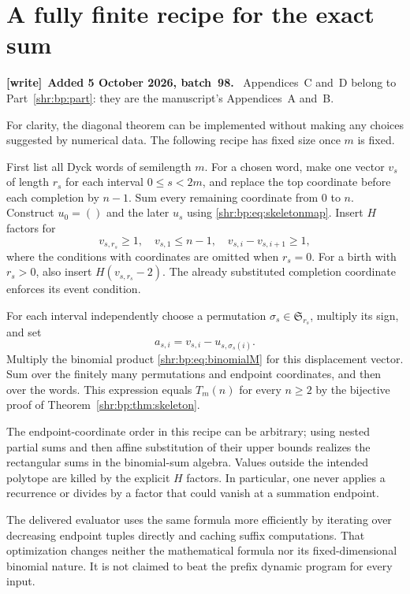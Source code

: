 \documentclass[11pt,letterpaper]{article}
\numberwithin{equation}{section}
\theoremstyle{definition}
\newcommand{\1}{\mathbf 1}
\newcommand{\Sym}{\mathfrak S}
\newenvironment{writenote}[1][]{\par\smallskip\begingroup\small
 \noindent\textbf{[write]}\if\relax\detokenize{#1}\relax\else~\textbf{#1.}\fi\ }%
 {\par\endgroup\smallskip}
\begin{document}
\section{A fully finite recipe for the exact sum}
\label{shr:bp:app:exact}
\begin{writenote}[Added 5 October 2026, batch~98]
Appendices~C and~D belong to Part~\ref{shr:bp:part}: they are the
manuscript's Appendices~A and~B.
\end{writenote}
For clarity, the diagonal theorem can be implemented without making any
choices suggested by numerical data. The following recipe has fixed
size once $m$ is fixed.

First list all Dyck words of semilength $m$. For a chosen word, make one
vector $v_s$ of length $r_s$ for each interval $0\le s<2m$, and replace
the top coordinate before each completion by $n-1$. Sum every remaining
coordinate from $0$ to $n$. Construct $u_0=()$ and the later $u_s$ using
\eqref{shr:bp:eq:skeletonmap}. Insert $H$ factors for
\[
 v_{s,r_s}\ge1,\quad v_{s,1}\le n-1,\quad
 v_{s,i}-v_{s,i+1}\ge1,
\]
where the conditions with coordinates are omitted when $r_s=0$.
For a birth with $r_s>0$, also insert $H(v_{s,r_s}-2)$.
The already substituted completion coordinate enforces its event condition.

For each interval independently choose a permutation
$\sigma_s\in\Sym_{r_s}$, multiply its sign, and set
\[
 a_{s,i}=v_{s,i}-u_{s,\sigma_s(i)}.
\]
Multiply the binomial product \eqref{shr:bp:eq:binomialM} for this displacement
vector. Sum over the finitely many permutations and endpoint coordinates,
and then over the words. This expression equals $T_m(n)$ for every
$n\ge2$ by the bijective proof of Theorem~\ref{shr:bp:thm:skeleton}.

The endpoint-coordinate order in this recipe can be arbitrary; using
nested partial sums and then affine substitution of their upper bounds
realizes the rectangular sums in the binomial-sum algebra. Values outside
the intended polytope are killed by the explicit $H$ factors. In
particular, one never applies a recurrence or divides by a factor that
could vanish at a summation endpoint.

The delivered evaluator uses the same formula more efficiently by
iterating over decreasing endpoint tuples directly and caching suffix
computations. That optimization changes neither the mathematical formula
nor its fixed-dimensional binomial nature. It is not claimed to beat the
prefix dynamic program for every input.
\end{document}
